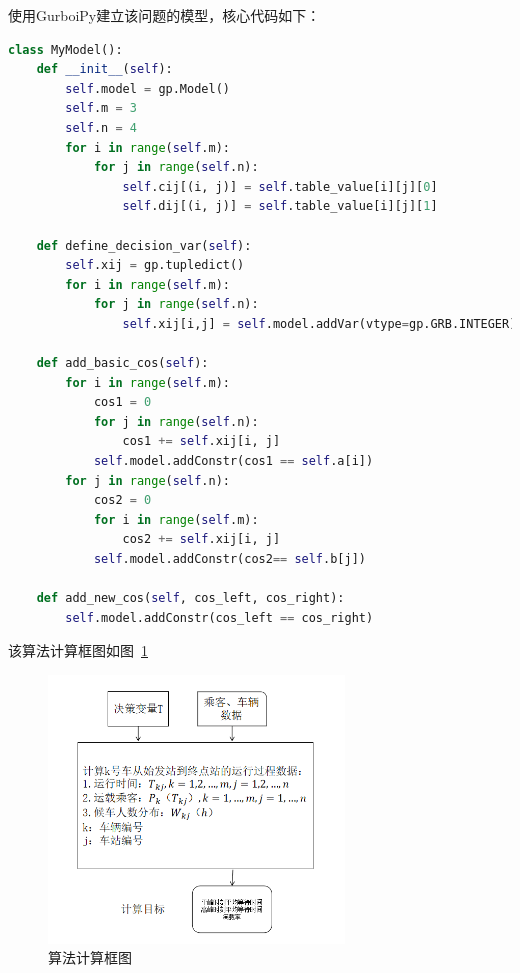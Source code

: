 使用GurboiPy建立该问题的模型，核心代码如下：
\begin{lstlisting}[breaklines=true,language=Python]
    class MyModel():
    def __init__(self):
        self.model = gp.Model()
        self.m = 3
        self.n = 4
        for i in range(self.m):
            for j in range(self.n):
                self.cij[(i, j)] = self.table_value[i][j][0]
                self.dij[(i, j)] = self.table_value[i][j][1]

    def define_decision_var(self):
        self.xij = gp.tupledict()
        for i in range(self.m):
            for j in range(self.n):
                self.xij[i,j] = self.model.addVar(vtype=gp.GRB.INTEGER)

    def add_basic_cos(self):
        for i in range(self.m):
            cos1 = 0
            for j in range(self.n):
                cos1 += self.xij[i, j]
            self.model.addConstr(cos1 == self.a[i])
        for j in range(self.n):
            cos2 = 0
            for i in range(self.m):
                cos2 += self.xij[i, j]
            self.model.addConstr(cos2== self.b[j])

    def add_new_cos(self, cos_left, cos_right):
        self.model.addConstr(cos_left == cos_right)
\end{lstlisting}

该算法计算框图如图~\ref{11}~
\begin{figure}[htbp!]
    \center
    \includegraphics[width=0.7\textwidth]{figs/chap03/k.png}
    \caption{算法计算框图}
    \label{11}
\end{figure}
